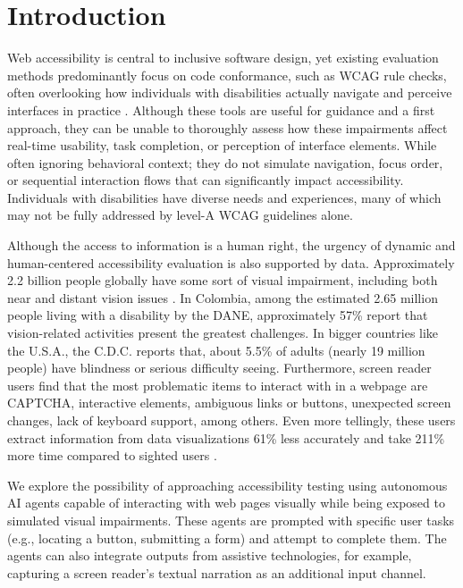 
\section{Introduction}

Web accessibility is central to inclusive software design, yet existing evaluation methods predominantly focus on code conformance, such as \ac{WCAG} rule checks, often overlooking how individuals with disabilities actually navigate and perceive interfaces in practice \cite{ara2024inclusive}. Although these tools are useful for guidance and a first approach, they can be unable to thoroughly assess how these impairments affect real-time usability, task completion, or perception of interface elements. While often ignoring behavioral context; they do not simulate navigation, focus order, or sequential interaction flows that can significantly impact accessibility. Individuals with disabilities have diverse needs and experiences, many of which may not be fully addressed by level-A \ac{WCAG} guidelines alone.

Although the access to information is a human right, the urgency of dynamic and human-centered accessibility evaluation is also supported by data. Approximately 2.2 billion people globally have some sort of visual impairment, including both near and distant vision issues \cite{who2023vision}. In Colombia, among the estimated 2.65 million people living with a disability by the DANE, approximately 57\% report that vision-related activities present the greatest challenges\cite{DANE2022}. In bigger countries like the U.S.A., the C.D.C. reports that, about 5.5\% of adults (nearly 19 million people) have blindness or serious difficulty seeing\cite{cdc2025disabilities}. Furthermore, screen reader users find that the most problematic items to interact with in a webpage are CAPTCHA, interactive elements, ambiguous links or buttons, unexpected screen changes, lack of keyboard support, among others\cite{webaimsurvey2025}. Even more tellingly, these users extract information from data visualizations 61\% less accurately and take 211\% more time compared to sighted users \cite{wobbrock2021assets}.

We explore the possibility of approaching accessibility testing using autonomous \ac{AI} agents capable of interacting with web pages visually while being exposed to simulated visual impairments. These agents are prompted with specific user tasks (e.g., locating a button, submitting a form) and attempt to complete them. The agents can also integrate outputs from assistive technologies, for example, capturing a screen reader's textual narration as an additional input channel. 

